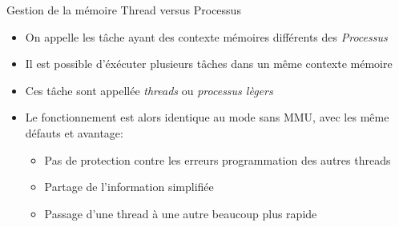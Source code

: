 \begin{frame}{ Gestion de la mémoire}
  Thread versus Processus
  \begin{itemize}
  \item On  appelle les tâche  ayant des contexte  mémoires différents
    des \emph{Processus}
  \item  Il est  possible  d'éxécuter plusieurs  tâches  dans un  même
    contexte mémoire
  \item  Ces  tâche sont  appellée  \emph{threads} ou  \emph{processus
      lègers}
  \item Le fonctionnement  est alors identique au mode  sans MMU, avec
    les même défauts et avantage:
    \begin{itemize}
    \item  Pas  de protection  contre  les  erreurs programmation  des
      autres threads
    \item Partage de l'information simplifiée
    \item Passage d'une thread à une autre beaucoup plus rapide
    \end{itemize}
  \end{itemize}
\end{frame} 




